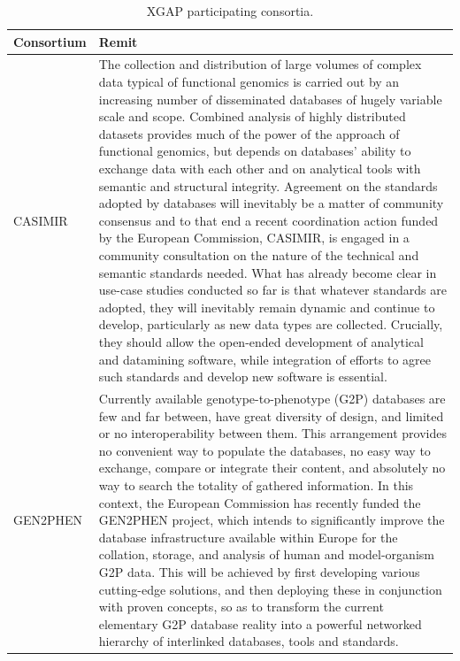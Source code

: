 \begin{table}
\small
\begin{tabularx}{\linewidth}{ l X }
  Consortium & Remit \\
  \hline
  \rule{0pt}{2.5ex}CASIMIR & The collection and distribution of large volumes of complex data typical of functional genomics is carried out by an increasing number of disseminated databases of hugely variable scale and scope. Combined analysis of highly distributed datasets provides much of the power of the approach of functional genomics, but depends on databases’ ability to exchange data with each other and on analytical tools with semantic and structural integrity. Agreement on the standards adopted by databases will inevitably be a matter of community consensus and to that end a recent coordination action funded by the European Commission, CASIMIR\cite{xgap_casimir}, is engaged in a community consultation on the nature of the technical and semantic standards needed. What has already become clear in use-case studies conducted so far is that whatever standards are adopted, they will inevitably remain dynamic and continue to develop, particularly as new data types are collected. Crucially, they should allow the open-ended development of analytical and datamining software, while integration of efforts to agree such standards and develop new software is essential.\\
  \rule{0pt}{2.5ex}GEN2PHEN & Currently available genotype-to-phenotype (G2P) databases are few and far between, have great diversity of design, and limited or no interoperability between them. This arrangement provides no convenient way to populate the databases, no easy way to exchange, compare or integrate their content, and absolutely no way to search the totality of gathered information. In this context, the European Commission has recently funded the GEN2PHEN project\cite{xgap_gen2phen}, which intends to significantly improve the database infrastructure available within Europe for the collation, storage, and analysis of human and model-organism G2P data. This will be achieved by first developing various cutting-edge solutions, and then deploying these in conjunction with proven concepts, so as to transform the current elementary G2P database reality into a powerful networked hierarchy of interlinked databases, tools and standards.\\
  \hline
\end{tabularx}
\caption[XGAP participating consortia]{XGAP participating consortia.}
\label{table:xgap_consortia}
\end{table}

